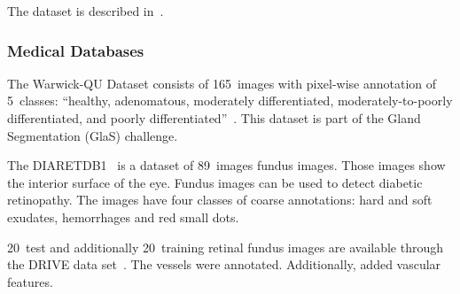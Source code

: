 The dataset is described in~\cite{shotton2006textonboost}.

\subsubsection{Medical Databases}

The Warwick-QU Dataset consists of 165~images with pixel-wise annotation of
5~classes: \enquote{healthy, adenomatous, moderately differentiated,
moderately-to-poorly differentiated, and poorly
differentiated}~\cite{coelho2009nuclear}. This dataset is part of the
Gland Segmentation (GlaS) challenge.

The DIARETDB1~\cite{kalesnykiene2014diaretdb1} is a dataset of 89~images fundus
images. Those images show the interior surface of the eye. Fundus images can
be used to detect diabetic retinopathy. The images have four classes of coarse
annotations: hard and soft exudates, hemorrhages and red small dots.

20~test and additionally 20~training retinal fundus images are available
through the DRIVE data set~\cite{staal2004ridge}. The vessels were annotated.
Additionally, \cite{azzopardi2011detection} added vascular features.
